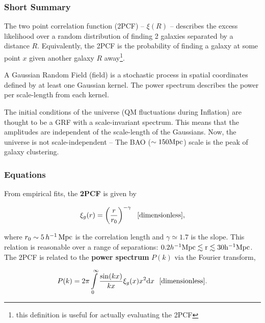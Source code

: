 \documentclass[\main/main.tex]{subfiles}
\begin{document}
	\subsubsection{Short Summary} %
	\label{ssub:short_summary}

		The two point correlation function (2PCF) -- $\xi(R)$ -- describes the excess likelihood over a random distribution of finding 2 galaxies separated by a distance $R$. Equivalently, the 2PCF is the probability of finding a galaxy at some point $x$ given another galaxy $R$ away\footnote{this definition is useful for actually evaluating the 2PCF}.

		A Gaussian Random Field (field) is a stochastic process in spatial coordinates defined by at least one Gaussian kernel. The power spectrum describes the power per scale-length from each kernel.

		The initial conditions of the universe (QM fluctuations during Inflation) are thought to be a GRF with a scale-invariant spectrum. This means that the amplitudes are independent of the scale-length of the Gaussians. Now, the universe is not scale-independent -- The BAO ($\sim 150 \rm{Mpc}$) scale is the peak of galaxy clustering.



	\subsubsection{Equations} %
	\label{ssub:equations}

		From empirical fits, the \textbf{2PCF} is given by

		\begin{equation*}\label{eq:q12_2pcf}
		    \xi_{g}(r) = \left(\frac{r}{r_0}\right)^{-\gamma} \ \ [{\rm dimensionless}],
		\end{equation*}

		{\noindent}where $r_0\sim5\,{h}^{-1}\, \rm{Mpc}$ is the correlation length and $\gamma\simeq1.7$ is the slope. This relation is reasonable over a range of separations: $0.2{h}^{-1} \rm{Mpc} \lesssim r \lesssim 30{h}^{-1} \rm{Mpc}$. The 2PCF is related to the \textbf{power spectrum} $P(k)$ via the Fourier transform,

		\begin{align*}\label{eq:q12_power_spectrum}
		    P(k) = 2\pi \int\limits_0^\infty \frac{\sin(kx)}{kx}\xi_{g}(x) x^2 \dif{x} \ \ [{\rm dimensionless}].
		\end{align*}
	
\end{document}
